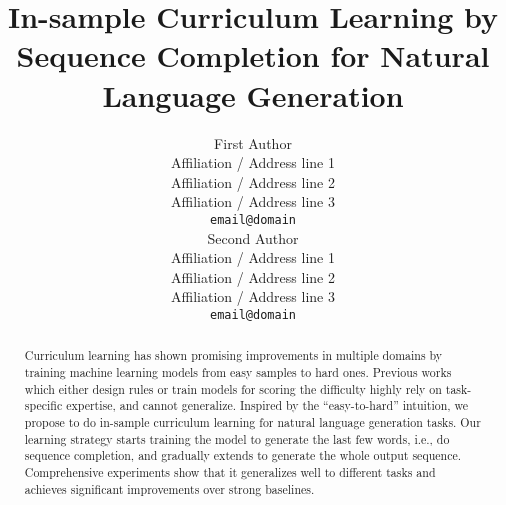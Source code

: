 \documentclass[11pt]{article}
\title{In-sample Curriculum Learning by Sequence Completion for Natural Language Generation}
\author{First Author \\
	Affiliation / Address line 1 \\
	Affiliation / Address line 2 \\
	Affiliation / Address line 3 \\
	\texttt{email@domain} \\\And
	Second Author \\
	Affiliation / Address line 1 \\
	Affiliation / Address line 2 \\
	Affiliation / Address line 3 \\
	\texttt{email@domain} \\}
\begin{document}
\maketitle

\begin{abstract}
Curriculum learning has shown promising improvements in multiple domains by 
training machine learning models from easy samples to hard ones. 
Previous works which either design rules or train models for scoring the difficulty 
highly rely on task-specific expertise, and cannot generalize. Inspired by the ``easy-to-hard'' 
intuition, we propose to do in-sample curriculum learning for natural language generation tasks. 
Our learning strategy starts training the model to generate the last few words, i.e., 
do sequence completion, and gradually extends to generate the whole output sequence.
Comprehensive experiments show that it generalizes well to different %
tasks and achieves significant improvements over strong baselines.
\end{abstract}







%



\clearpage
\newpage
\appendix

\end{document}
